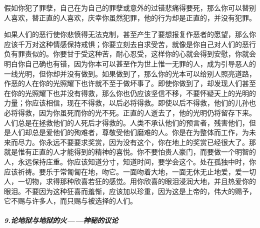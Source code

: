 \par 假如你犯了罪孽，自己在为自己的罪孽或意外的过错悲痛得要死，那么你可以替别人喜欢，替正直的人喜欢，庆幸你虽然犯罪，他的行为却是正直的，并没有犯罪。
\par 如果人们的恶行使你悲愤得无法克制，甚至产生了要想报复作恶者的愿望，那么你应该千万对这种情感保持戒惧；你要立刻去自求受苦，就像是你自己对人们的恶行负有罪责似的。你要甘于受这种苦，耐心忍受，这样你的心就会得到安慰，你就会明白你自己确也有错，因为你本可以甚至作为世上惟一无罪的人，成为引导恶人的一线光明，但你却并没有做到。如果做到了，那么你的光本可以给别人照亮道路，作恶的人在你的光照耀下也许就不至于做坏事了。即使你做到了，却发现人们甚至在你的光照耀下也并没有得救，那么你也仍应该坚信不移，不要怀疑天上的光明的力量；你应该相信，现在不得救，以后必将得救。即使以后不得救，他们的儿孙也必将得救，因为你虽死而你的光不死。正直的人逝去了，他的光明仍将留存下来。人们总是在拯救他们的人死后才得救的。人类不承认他们的预言者，残害他们，但是人们却总是爱他们的殉难者，尊敬受他们磨难的人。你是在为整体而工作，为未来而尽力。你永远不要要求奖赏，因为没有这个，你在地上的奖赏已经很大了。那就是惟有正直的人才能得到的精神的喜悦。你不要怕贵人豪门，而要做一个明智的人，永远保持庄重。你应该知道分寸，知道时间，要学会这个。处在孤独中时，你应该祈祷。要乐于常匍匐在地，吻它。一面吻着大地，一面无休无止地爱，爱一切人，一切物，求得那种欣喜若狂的感觉。用你欣喜的眼泪浸润大地，并且热爱你的眼泪。不要因为这种狂喜而羞惭，应该加以珍重，因为这是上帝的，伟大的赐予，它不赐与许多人，而只赐与被选择的人们。
\subparagraph*{9.论地狱与地狱的火——神秘的议论}
